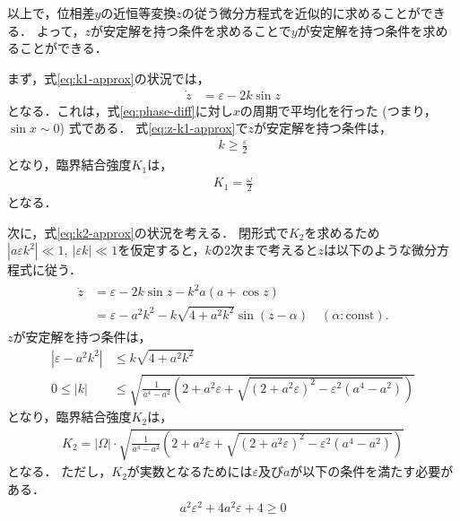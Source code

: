 \documentclass[../main]{subfiles}
\begin{document}
    以上で，位相差$y$の近恒等変換$z$の従う微分方程式を近似的に求めることができる．
    よって，$z$が安定解を持つ条件を求めることで$y$が安定解を持つ条件を求めることができる．
    
    まず，式\eqref{eq:k1-approx}の状況では，
    \begin{align}
        \dot{z}&=\varepsilon-2k\sin z
        \label{eq:z-k1-approx}
    \end{align}
    となる．これは，式\eqref{eq:phase-diff}に対し$x$の周期で平均化を行った (つまり，$\sin x\sim 0$) 式である．
    式\eqref{eq:z-k1-approx}で$z$が安定解を持つ条件は，
    \begin{align*}
        k\geq\frac{\varepsilon}{2}
    \end{align*}
    となり，臨界結合強度$K_1$は，
    \begin{align}
        \label{eq:K1-approx}
        K_1=\frac{\omega}{2}
    \end{align}
    となる．

    次に，式\eqref{eq:k2-approx}の状況を考える．
    閉形式で$K_2$を求めるため$|a\varepsilon k^2| \ll 1,\ |\varepsilon k|\ll 1$を仮定すると，$k$の2次まで考えると$z$は以下のような微分方程式に従う．
    \begin{align}
        \label{eq:z-k2-approx}
        \begin{split}
            \dot{z}&=\varepsilon-2k\sin z-k^2a(a+\cos  z)\\
            &=\varepsilon-a^2k^2-k\sqrt{4+a^2k^2}\sin ( z-\alpha)\quad(\alpha:\mathrm{const}).
        \end{split}
    \end{align}
    $z$が安定解を持つ条件は，
    \begin{align*}
        |\varepsilon-a^2k^2|&\leq k\sqrt{4+a^2k^2}\\
        0\leq |k|&\leq \sqrt{\frac{1}{a^4-a^2}\left(2+a^2\varepsilon+\sqrt{(2+a^2\varepsilon)^2-\varepsilon^2(a^4-a^2)}\right)}
    \end{align*}
    となり，臨界結合強度$K_2$は，
    \begin{align}
        \label{eq:K2-approx}
        K_2=|\Omega|\cdot\sqrt{\frac{1}{a^4-a^2}\left(2+a^2\varepsilon+\sqrt{(2+a^2\varepsilon)^2-\varepsilon^2(a^4-a^2)}\right)}
    \end{align}
    となる．
    ただし，$K_2$が実数となるためには$\varepsilon$及び$a$が以下の条件を満たす必要がある．
    \begin{align*}
        a^2\varepsilon^2+4a^2\varepsilon+4\geq 0
    \end{align*}
\end{document}
